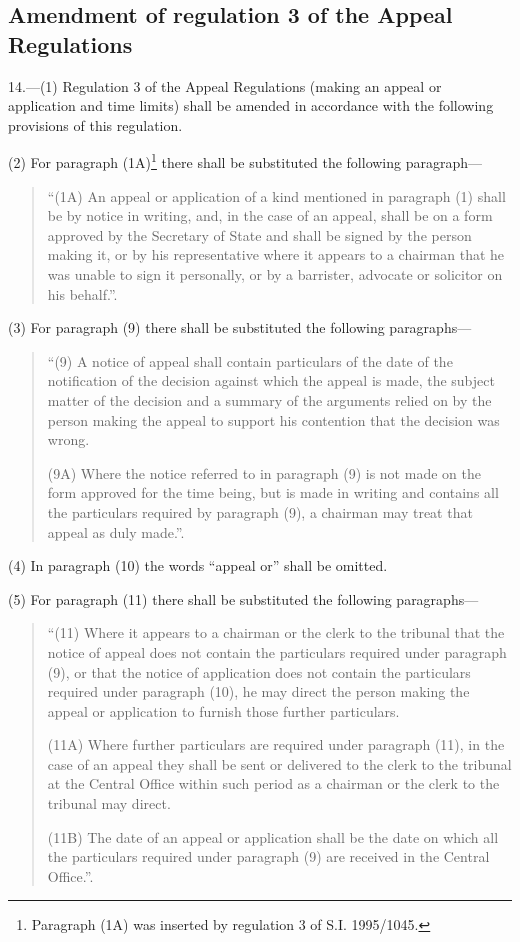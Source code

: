 \documentclass[12pt,a4paper]{article}
\begin{document}
\subsection[14. Amendment of regulation 3 of the Appeal Regulations]{Amendment of regulation 3 of the Appeal Regulations}

14.—(1) Regulation 3 of the Appeal Regulations (making an appeal or application and time limits) shall be amended in accordance with the following provisions of this regulation.

(2) For paragraph (1A)\footnote{\frenchspacing Paragraph (1A) was inserted by regulation 3 of S.I. 1995/1045.} there shall be substituted the following paragraph—
\begin{quotation}
“(1A) An appeal or application of a kind mentioned in paragraph (1) shall be by notice in writing, and, in the case of an appeal, shall be on a form approved by the Secretary of State and shall be signed by the person making it, or by his representative where it appears to a chairman that he was unable to sign it personally, or by a barrister, advocate or solicitor on his behalf.”.
\end{quotation}

(3) For paragraph (9) there shall be substituted the following paragraphs—
\begin{quotation}
“(9) A notice of appeal shall contain particulars of the date of the notification of the decision against which the appeal is made, the subject matter of the decision and a summary of the arguments relied on by the person making the appeal to support his contention that the decision was wrong.

(9A) Where the notice referred to in paragraph (9) is not made on the form approved for the time being, but is made in writing and contains all the particulars required by paragraph (9), a chairman may treat that appeal as duly made.”.
\end{quotation}

(4) In paragraph (10) the words “appeal or” shall be omitted.

(5) For paragraph (11) there shall be substituted the following paragraphs—
\begin{quotation}
“(11) Where it appears to a chairman or the clerk to the tribunal that the notice of appeal does not contain the particulars required under paragraph (9), or that the notice of application does not contain the particulars required under paragraph (10), he may direct the person making the appeal or application to furnish those further particulars.

(11A) Where further particulars are required under paragraph (11), in the case of an appeal they shall be sent or delivered to the clerk to the tribunal at the Central Office within such period as a chairman or the clerk to the tribunal may direct.

(11B) The date of an appeal or application shall be the date on which all the particulars required under paragraph (9) are received in the Central Office.”.
\end{quotation}
\end{document}
